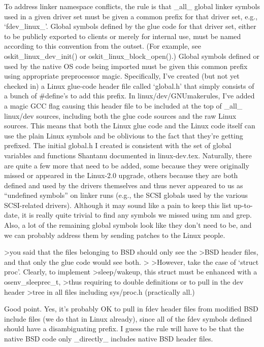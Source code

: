 {To address linker namespace conflicts,
the rule is that _all_ global linker symbols used in a given driver set
must be given a common prefix for that driver set, e.g., `fdev_linux_'.
Global symbols defined by the glue code for that driver set,
either to be publicly exported to clients or merely for internal use,
must be named according to this convention from the outset.
(For example, see oskit_linux_dev_init() or oskit_linux_block_open().)
Global symbols defined or used by the native OS code being imported
must be given this common prefix using appropriate preprocessor magic.
Specifically, I've created (but not yet checked in)
a Linux glue-code header file called `global.h'
that simply consists of a bunch of #define's to add this prefix.
In linux/dev/GNUmakerules, I've added a magic GCC flag
causing this header file to be included at the top of _all_ linux/dev sources,
including both the glue code sources and the raw Linux sources.
This means that both the Linux glue code and the Linux code itself
can use the plain Linux symbols and be oblivious to the fact
that they're getting prefixed.
The initial global.h I created is consistent with the set
of global variables and functions Shantanu documented in linux-dev.tex.
Naturally, there are quite a few more that need to be added,
some because they were originally missed or appeared in the Linux-2.0 upgrade,
others because they are both defined and used by the drivers themselves
and thus never appeared to us as ``undefined symbols'' on linker runs
(e.g., the SCSI globals used by the various SCSI-related drivers).
Although it may sound like a pain to keep this list up-to-date,
it is really quite trivial to find any symbols we missed using nm and grep.
Also, a lot of the remaining global symbols look like they don't need to be,
and we can probably address them by sending patches to the Linux people.

>you said that the files belonging to BSD should only see the
>BSD header files, and that only the glue code would see both.
>
>However, take the case of `struct proc'. Clearly, to implement
>sleep/wakeup, this struct must be enhanced with a osenv_sleeprec_t,
>thus requiring to double definitions or to pull in the dev header
>tree in all files including sys/proc.h (practically all.)

Good point.  Yes, it's probably OK to pull in fdev header files
from modified BSD include files (we do that in Linux already),
since all of the fdev symbols defined should have a disambiguating prefix.
I guess the rule will have to be that the native BSD code
only _directly_ includes native BSD header files.

}%


